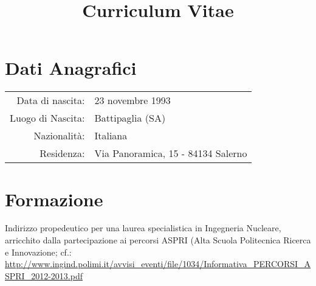 \documentclass[11pt,a4paper,sans]{moderncv}        %
\title{Curriculum Vitae}                               %
\begin{document}
\makecvtitle

\thispagestyle{empty}

\section{Dati Anagrafici}

\setlength\tabcolsep{0.2cm}

\begin{center}
	\begin{tabular} {r l}
  Data di nascita: & 23 novembre 1993 \\
  Luogo di Nascita: & Battipaglia (SA) \\
  Nazionalità: & Italiana\\
  Residenza: & Via Panoramica, 15 - 84134 Salerno
	\end{tabular}
\end{center}


\section{Formazione}
{
Indirizzo propedeutico per una laurea specialistica in Ingegneria Nucleare, arricchito dalla partecipazione ai percorsi ASPRI (Alta Scuola Politecnica Ricerca e Innovazione; cf.:  
\url{http://www.ingind.polimi.it/avvisi_eventi/file/1034/Informativa_PERCORSI_ASPRI_2012-2013.pdf}
}  %

{}

\end{document}

